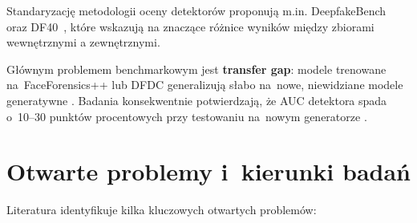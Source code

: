 Standaryzację metodologii oceny detektorów proponują m.in.
DeepfakeBench~\cite{wang2023deepfakebench} oraz DF40~\cite{sun2024df40},
które wskazują na znaczące różnice wyników między zbiorami wewnętrznymi
a zewnętrznymi.

G\l{}\'{o}wnym problemem benchmarkowym jest \textbf{transfer gap}: modele
trenowane na~FaceForensics++ lub DFDC generalizuj\k{a} s\l{}abo na~nowe,
niewidziane modele generatywne \cite{Peng2024GenerationDetection}.
Badania konsekwentnie potwierdzaj\k{a},
\.{z}e AUC detektora spada o~10--30 punkt\'{o}w procentowych
przy testowaniu na~nowym generatorze \cite{Wang2024ReliabilityPerspective}.

\section{Otwarte problemy i~kierunki bada\'{n}}
\label{sec:otwarte_problemy}

Literatura identyfikuje kilka kluczowych otwartych problem\'{o}w:

